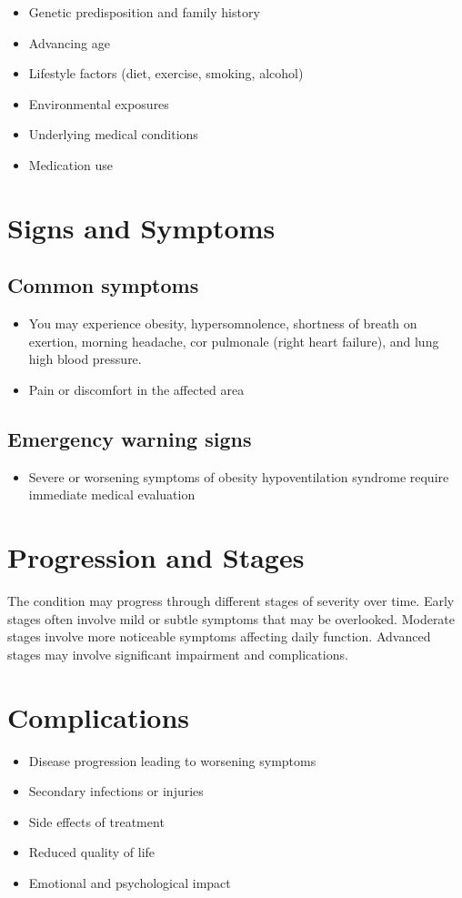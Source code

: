\begin{itemize}[noitemsep]
  \item Genetic predisposition and family history
  \item Advancing age
  \item Lifestyle factors (diet, exercise, smoking, alcohol)
  \item Environmental exposures
  \item Underlying medical conditions
  \item Medication use
\end{itemize}
\section{Signs and Symptoms}

\subsection{Common symptoms}
\begin{itemize}[noitemsep]
  \item You may experience obesity, hypersomnolence, shortness of breath on exertion, morning headache, cor pulmonale (right heart failure), and lung high blood pressure.

  \item Pain or discomfort in the affected area
  \end{itemize}

\subsection{Emergency warning signs}
\begin{itemize}[noitemsep]
  \item Severe or worsening symptoms of obesity hypoventilation syndrome require immediate medical evaluation
\end{itemize}
\section{Progression and Stages}
The condition may progress through different stages of severity over time. Early stages often involve mild or subtle symptoms that may be overlooked. Moderate stages involve more noticeable symptoms affecting daily function. Advanced stages may involve significant impairment and complications.
\section{Complications}
\begin{itemize}[noitemsep]
  \item Disease progression leading to worsening symptoms
  \item Secondary infections or injuries
  \item Side effects of treatment
  \item Reduced quality of life
  \item Emotional and psychological impact
\end{itemize}
